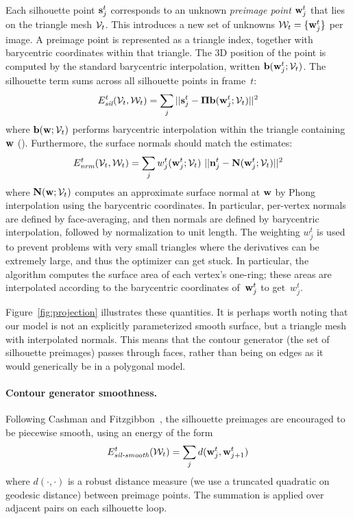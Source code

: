 \documentclass[preprint]{acmsiggraph}
\begin{document}
Each silhouette point $\mathbf{s}_j^t$ corresponds to an unknown \textit{preimage
point} $\mathbf{w}_j^t$ that lies on the triangle mesh $\mathcal{V}_t$.  This introduces a new set of unknowns $\mathcal{W}_t = \{\mathbf{w}_j^t\}$ per image.  
A preimage point is represented as a triangle index, together with
barycentric coordinates 
within that triangle. The 3D position of the point is computed by
the standard barycentric interpolation, written $\mathbf{b}(\mathbf{w}_j^t; \mathcal{V}_t)$.
The silhouette term sums across all silhouette points in frame~$t$:
\begin{equation}
E_{\text{\em sil}}^t(\mathcal{V}_t, \mathcal{W}_t) = \sum_j || \mathbf{s}_j^t - \mbox{\boldmath$\Pi$} \mathbf{b}(\mathbf{w}_j^t; \mathcal{V}_t) ||^2
\label{eq:Epreimage}
\end{equation}
where $\mathbf{b}(\mathbf{w}; \mathcal{V}_t)$ performs barycentric interpolation
within the triangle containing $\mathbf{w}$ ().
Furthermore, the surface normals should match the estimates:
\begin{equation}
E_{\text{\em nrm}}^t(\mathcal{V}_t, \mathcal{W}_t) = \sum_j w_j^t(\mathbf{w}_j^t; \mathcal{V}_t)\ || \mathbf{n}_j^t - \mathbf{N}(\mathbf{w}_j^t; \mathcal{V}_t) ||^2
\label{eq:Enormals}
\end{equation}
where $\mathbf{N}(\mathbf{w}; \mathcal{V}_t)$ computes an approximate surface normal at
$\mathbf{w}$ by Phong interpolation using the barycentric coordinates. 
In particular, per-vertex normals are defined by face-averaging, and then normals are defined by barycentric interpolation, followed by normalization to unit length.
The weighting $w_j^t$ is used to prevent problems with very small triangles where the derivatives can be extremely large, and thus the optimizer can get stuck.
In particular, the algorithm computes the surface area of each vertex's one-ring; these areas are interpolated according to the barycentric coordinates of~$\mathbf{w}_j^t$ to get~$w_j^t$.

Figure~\ref{fig:projection} illustrates these quantities.  It is perhaps worth noting that our model is not an explicitly parameterized smooth surface, but a triangle mesh with interpolated normals.  This means that the contour generator (the set of silhouette preimages) passes through faces, rather than being on edges as it would generically be in a polygonal model.   

\paragraph{Contour generator smoothness.}
Following Cashman and Fitzgibbon~, the silhouette preimages are encouraged to be piecewise smooth, using an energy of the form
\begin{equation}
E_{\text{\em sil-smooth}}^t(\mathcal{W}_t) = \sum_j d(\mathbf{w}_j^t, \mathbf{w}_{j+1}^t)
\end{equation}
where $d(\cdot,\cdot)$ is a robust distance measure (we use a truncated quadratic on geodesic distance) between preimage points. The summation is applied over adjacent pairs on each silhouette loop.
\end{document}
